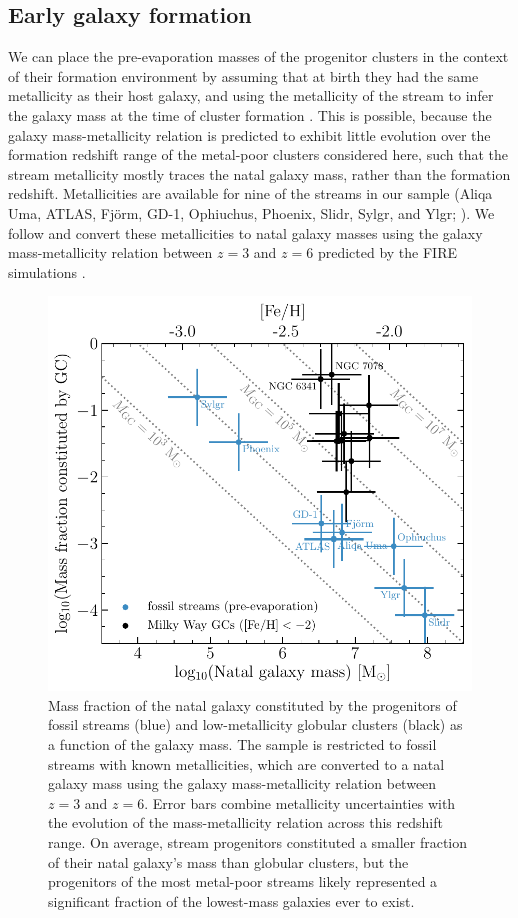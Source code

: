 \documentclass[twocolumn]{aastex63}
\begin{document}
\subsection{Early galaxy formation}
\label{sec:discuss_galform}
We can place the pre-evaporation masses of the progenitor clusters in the context of their formation environment by assuming that at birth they had the same metallicity as their host galaxy, and using the metallicity of the stream to infer the galaxy mass at the time of cluster formation \citep{kruijssen20b}. This is possible, because the galaxy mass-metallicity relation is predicted to exhibit little evolution over the formation redshift range of the metal-poor clusters considered here, such that the stream metallicity mostly traces the natal galaxy mass, rather than the formation redshift. Metallicities are available for nine of the streams in our sample (Aliqa Uma, ATLAS, Fj\"orm, GD-1, Ophiuchus, Phoenix, Slidr, Sylgr, and Ylgr; \citealt{ibata:2019,li:2020,wan20}). We follow \citet{kruijssen19c} and convert these metallicities to natal galaxy masses using the galaxy mass-metallicity relation between $z=3$ and $z=6$ predicted by the FIRE simulations \citep{ma16}.

\begin{figure}
\includegraphics[width=\hsize]{figures/mhost_fraction.pdf}
\caption{
\label{fig:mhost}
Mass fraction of the natal galaxy constituted by the progenitors of fossil streams (blue) and low-metallicity globular clusters (black) as a function of the galaxy mass.
The sample is restricted to fossil streams with known metallicities, which are converted to a natal galaxy mass using the galaxy mass-metallicity relation between $z=3$ and $z=6$.
Error bars combine metallicity uncertainties with the evolution of the mass-metallicity relation across this redshift range.
On average, stream progenitors constituted a smaller fraction of their natal galaxy's mass than globular clusters, but the progenitors of the most metal-poor streams likely represented a significant fraction of the lowest-mass galaxies ever to exist.
}
\end{figure}
\end{document}
